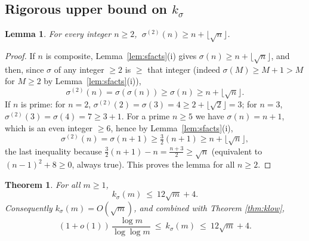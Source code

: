 \documentclass{amsart}
\newtheorem{theorem}{Theorem}
\newtheorem{lemma}{Lemma}
\theoremstyle{definition}
\begin{document}
\subsection{Rigorous upper bound on $k_\sigma$}

\begin{lemma}\label{lem:twostep}
For every integer $n\ge2$, $\ \sigma^{(2)}(n)\ge n+\lfloor\sqrt n\rfloor$.
\end{lemma}

\begin{proof}
If $n$ is composite, Lemma~\ref{lem:sfacts}(i) gives
$\sigma(n)\ge n+\lfloor\sqrt n\rfloor$, and then, since $\sigma$ of any integer
$\ge2$ is $\ge$ that integer (indeed $\sigma(M)\ge M+1>M$ for $M\ge2$ by
Lemma~\ref{lem:sfacts}(i)),
\[
\sigma^{(2)}(n)=\sigma(\sigma(n))\ge \sigma(n)\ge n+\lfloor\sqrt n\rfloor .
\]
If $n$ is prime: for $n=2$, $\sigma^{(2)}(2)=\sigma(3)=4\ge 2+\lfloor\sqrt2\rfloor=3$;
for $n=3$, $\sigma^{(2)}(3)=\sigma(4)=7\ge 3+1$. For a prime $n\ge5$ we have
$\sigma(n)=n+1$, which is an even integer $\ge6$, hence by
Lemma~\ref{lem:sfacts}(i),
\[
\sigma^{(2)}(n)=\sigma(n+1)\ge\tfrac32(n+1)\ge n+\lfloor\sqrt n\rfloor,
\]
the last inequality because $\tfrac32(n+1)-n=\tfrac{n+3}2\ge\sqrt n$ (equivalent
to $(n-1)^2+8\ge0$, always true). This proves the lemma for all $n\ge2$.
\end{proof}

\begin{theorem}\label{thm:kup}
For all $m\ge1$,
\[
k_\sigma(m)\ \le\ 12\sqrt{m}+4 .
\]
Consequently $k_\sigma(m)=O(\sqrt m)$, and combined with Theorem
\ref{thm:klow},
\[
(1+o(1))\,\frac{\log m}{\log\log m}\ \le\ k_\sigma(m)\ \le\ 12\sqrt m+4 .
\]
\end{theorem}
\end{document}

